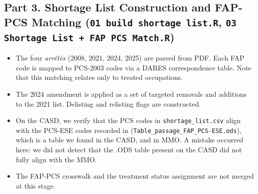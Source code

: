 \documentclass[10pt, a4paper]{article}
\begin{document}
\subsection*{Part 3. Shortage List Construction and FAP-PCS Matching
\textnormal{\small(\texttt{01 build shortage list.R},
\texttt{03 Shortage List + FAP PCS Match.R})}}
\smallskip
\begin{itemize}
  \item The four \textit{arrêtés} (2008, 2021, 2024, 2025) are parsed from
  PDF. Each FAP code is mapped to PCS-2003 codes via a DARES
  correspondence table. Note that this matching relates only to treated occupations.
  \smallskip
  \item The 2024 amendment is applied as a set of targeted removals and
  additions to the 2021 list. Delisting and relisting flags are constructed.
 \smallskip
  \item On the CASD, we verify that the PCS codes in
  \texttt{shortage\_list.csv} align with the PCS-ESE codes recorded in  (\texttt{Table\_passage\_FAP\_PCS-ESE.ods}), which is a table we found in the CASD, and in MMO. A mistake occurred here: we did not detect that the .ODS table present on the CASD did not fully align with the MMO. 
  \smallskip
  \item The FAP-PCS crosswalk and the treatment status assignment are not merged at this stage.
\end{itemize}
\bigskip
\end{document}
